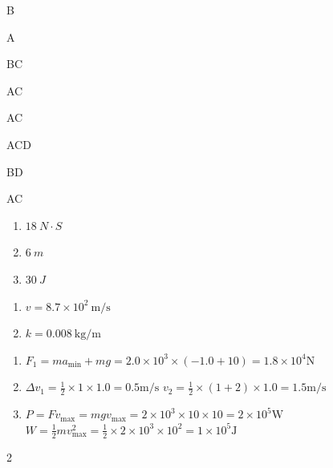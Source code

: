 \item B
\item A
\item BC
\item AC
\item AC
\item ACD
\item BD
\item AC
\item \begin {enumerate} \renewcommand {\labelenumi }{\arabic {enumi}.} \item $ 18 \ N \cdot S $ \item $ 6 \ m $ \item $ 30 \ J $ \end {enumerate} \par \par 
\item \begin {enumerate} \renewcommand {\labelenumi }{\arabic {enumi}.} \item $v = 8.7 \times 10 ^ { 2 } \ \mathrm { m } / \mathrm { s }$ \item $k = 0.008\ \mathrm { kg } / \mathrm { m }$ \par \end {enumerate} \par \par 
\item \begin {enumerate} \renewcommand {\labelenumi }{\arabic {enumi}.} \item $F _ { 1 } = m a _ { \min } + m g = 2.0 \times 10 ^ { 3 } \times ( - 1.0 + 10 ) = 1.8 \times 10 ^ { 4 } \mathrm { N }$ \item $\Delta v _ { 1 } = \frac { 1 } { 2 } \times 1 \times 1.0 = 0.5 \mathrm { m } / \mathrm { s }$ \qquad $v _ { 2 } = \frac { 1 } { 2 } \times ( 1 + 2 ) \times 1.0 = 1.5 \mathrm { m } / \mathrm { s }$ \item $P = F v _ { \max } = m g v _ { \max } = 2 \times 10 ^ { 3 } \times 10 \times 10 = 2 \times 10 ^ { 5 } \mathrm { W }$ \qquad $W = \frac { 1 } { 2 } m v _ { \max } ^ { 2 } = \frac { 1 } { 2 } \times 2 \times 10 ^ { 3 } \times 10 ^ { 2 } = 1 \times 10 ^ { 5 } \mathrm { J }$ \par \par \par \end {enumerate} \par \par 
\item 2
